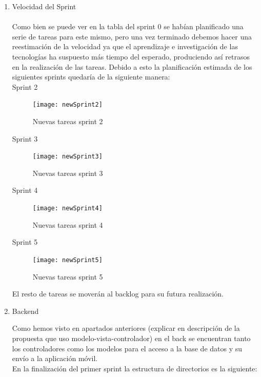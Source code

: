 \begin{enumerate}
	\item Velocidad del Sprint \\ \\
	Como bien se puede ver en la tabla del sprint 0 se habían planificado una serie de tareas para este mismo, pero una vez terminado debemos hacer una reestimación de la velocidad ya que el aprendizaje e investigación de las tecnologías ha suspuesto más tiempo del esperado, produciendo así retrasos en la realización de las tareas. Debido a esto la planificación estimada de los siguientes sprints quedaría de la siguiente manera: \\
	
	Sprint 2 \\
	\begin{figure}[H]
		\centering
		\texttt{[image: newSprint2]}
		\caption{Nuevas tareas sprint 2}
		\label{fig:newsprint2}
	\end{figure}
	
	
	Sprint 3 \\
	\begin{figure}[H]
		\centering
		\texttt{[image: newSprint3]}
		\caption{Nuevas tareas sprint 3}
		\label{fig:newsprint3}
	\end{figure}
	
	Sprint 4 \\
	\begin{figure}[H]
		\centering
		\texttt{[image: newSprint4]}
		\caption{Nuevas tareas sprint 4}
		\label{fig:newsprint4}
	\end{figure}
	
	
	Sprint 5 \\ 
	\begin{figure}[H]
		\centering
		\texttt{[image: newSprint5]}
		\caption{Nuevas tareas sprint 5}
		\label{fig:newsprint5}
	\end{figure}
	
	El resto de tareas se moverán al backlog para su futura realización.
	
	\item Backend
	
	Como hemos visto en apartados anteriores (explicar en descripción de la propuesta que uso modelo-vista-controlador) en el back se encuentran tanto los controladores como los modelos para el acceso a la base de datos y su envío a la aplicación móvil. \\
	
	En la finalización del primer sprint la estructura de directorios es la siguiente:
	

\end{enumerate}
